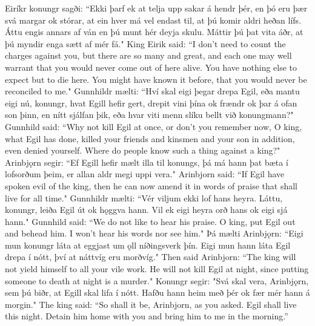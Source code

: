 \begin{paracol}{2}
    Eiríkr konungr sagði: ``Ekki þarf ek at telja upp sakar á hendr þér, en þó eru þær svá margar ok stórar, at ein hver má vel endast til, at þú komir aldri heðan lífs. Áttu engis annars af ván en þú munt hér deyja skulu. Máttir þú þat vita áðr, at þú myndir enga sætt af mér fá."
    \switchcolumn
    King Eirik said: ``I don't need to count the charges against you, but there are so many and great, and each one may well warrant that you would never come out of here alive. You have nothing else to expect but to die here. You might have known it before, that you would never be reconciled to me."
    \switchcolumn*
    Gunnhildr mælti: ``Hví skal eigi þegar drepa Egil, eða mantu eigi nú, konungr, hvat Egill hefir gert, drepit vini þína ok frændr ok þar á ofan son þinn, en nítt sjálfan þik, eða hvar viti menn slíku bellt við konungmann?"
    \switchcolumn
    Gunnhild said: ``Why not kill Egil at once, or don't you remember now, O king, what Egil has done, killed your friends and kinsmen and your son in addition, even denied yourself. Where do people know such a thing against a king?"
    \switchcolumn*
    Arinbjǫrn segir: ``Ef Egill hefir mælt illa til konungs, þá má hann þat bæta í lofsorðum þeim, er allan aldr megi uppi vera."
    \switchcolumn
    Arinbjorn said: ``If Egil have spoken evil of the king, then he can now amend it in words of praise that shall live for all time."
    \switchcolumn*
    Gunnhildr mælti: ``Vér viljum ekki lof hans heyra. Láttu, konungr, leiða Egil út ok hǫggva hann. Vil ek eigi heyra orð hans ok eigi sjá hann."
    \switchcolumn
    Gunnhild said: ``We do not like to hear his praise. O king, put Egil out and behead him. I won't hear his words nor see him."
    \switchcolumn*
    Þá mælti Arinbjǫrn: ``Eigi mun konungr láta at eggjast um ǫll níðingsverk þín. Eigi mun hann láta Egil drepa í nótt, því at náttvíg eru morðvíg.\footnotemark[1] "
    \switchcolumn
    Then said Arinbjorn: ``The king will not yield himself to all your vile work. He will not kill Egil at night, since putting someone to death at night is a murder."
    \switchcolumn*
    Konungr segir: "Svá skal vera, Arinbjǫrn, sem þú biðr, at Egill skal lifa í nótt. Hafðu hann heim með þér ok fær mér hann á morgin."
    \switchcolumn
    The king said: ``So shall it be, Arinbjorn, as you asked. Egil shall live this night. Detain him home with you and bring him to me in the morning.''
\end{paracol}
